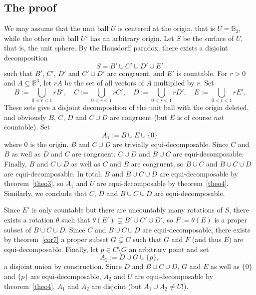 \documentclass[12pt]{article}
\newcommand{\Bigcup}{\bigcup\limits}
\newcommand{\mbb}{\mathbb}
\begin{document}
\subsection*{The proof}
We may assume that the unit ball $U$ is centered at the origin, that
is $U=\mbb{B}_3$, while the other unit ball $U'$ has an arbitrary
origin.
Let $S$ be the surface of $U$, that is, the unit sphere. By the
Hausdorff paradox, there exists a disjoint decomposition
\begin{equation*}
S=B'\cup C'\cup D'\cup E'
\end{equation*}
such that $B'$, $C'$, $D'$ and $C'\cup D'$ are congruent, and $E'$ is
countable. For $r>0$ and $A\subseteq\mbb{R}^3$, let $rA$ be the set of
all vectors of $A$ multiplied by $r$. Set
\begin{equation*}
B:=\Bigcup_{0<r<1}rB',\quad C:=\Bigcup_{0<r<1}rC',\quad D:=\Bigcup_{0<r<1}rD',\quad E:=\Bigcup_{0<r<1}rE'.
\end{equation*}
These sets give a disjoint decomposition of the unit ball with the
origin deleted, and obviously $B$, $C$, $D$ and $C\cup D$
are congruent (but $E$ is of course \emph{not} countable). Set
\begin{equation*}
A_1:=B\cup E\cup\{0\}
\end{equation*}
where $0$ is the origin. $B$ and $C\cup D$ are trivially
equi-decomposable. Since $C$ and $B$ as well as $D$ and $C$ are
congruent, $C\cup D$ and $B\cup C$ are equi-decomposable. Finally, $B$
and $C\cup D$ as well as $C$ and $B$ are congruent, so $B\cup C$ and
$B\cup C\cup D$ are equi-decomposable. In total, $B$ and $B\cup C\cup
D$ are equi-decomposable by theorem~\ref{theo3}, so $A_1$ and $U$ are
equi-decomposable by theorem~\ref{theo4}. Similarly, we conclude that
$C$, $D$ and $B\cup C\cup D$ are equi-decomposable.

Since $E'$ is only countable but there are uncountably many rotations
of $S$, there exists a rotation $\theta$ such that
$\theta(E')\subsetneq B'\cup C'\cup D'$, so $F:=\theta(E)$ is a proper
subset of $B\cup C\cup D$. Since $C$ and $B\cup C\cup D$ are
equi-decomposable, there exists by theorem~\ref{cor7} a proper subset
$G\subsetneq C$ such that $G$ and $F$ (and thus $E$) are
equi-decomposable. Finally, let $p\in C\setminus G$ an arbitrary point
and set
\begin{equation*}
A_2:=D\cup G\cup\{p\},
\end{equation*}
a disjoint union by construction. Since $D$ and $B\cup C\cup D$, $G$
and $E$ as well as $\{0\}$ and $\{p\}$ are equi-decomposable, $A_2$
and $U$ are equi-decomposable by theorem~\ref{theo4}. $A_1$ and $A_2$
are disjoint (but $A_1\cup A_2\neq U$!).
\end{document}
